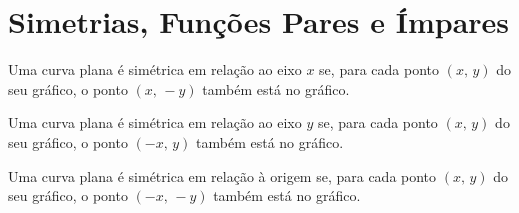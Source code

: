 \section{Simetrias, Funções Pares e Ímpares}
\begin{frame}
  \begin{definition}
    Uma curva plana é simétrica em relação ao eixo $x$ se, para cada ponto $(x,\,y)$ do seu gráfico, o ponto $(x,\,-y)$ também está no gráfico.
  \end{definition}
  \begin{figure}
  \end{figure}
\end{frame}

\begin{frame}
  \begin{definition}
    Uma curva plana é simétrica em relação ao eixo $y$ se, para cada ponto $(x,\,y)$ do seu gráfico, o ponto $(-x,\,y)$ também está no gráfico.
  \end{definition}
  \begin{figure}
  \end{figure}
\end{frame}

\begin{frame}
  \begin{definition}
    Uma curva plana é simétrica em relação à origem se, para cada ponto $(x,\,y)$ do seu gráfico, o ponto $(-x,\,-y)$ também está no gráfico.
  \end{definition}
  \begin{figure}
  \end{figure}
\end{frame}

